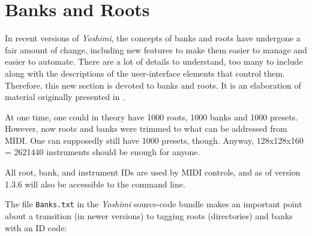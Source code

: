 %
%
%

\section{Banks and Roots}
\label{sec:banks_and_roots}

   In recent versions of \textsl{Yoshimi}, the concepts of banks and roots
   have undergone a fair amount of change, including new features to make
   them easier to manage and easier to automate.  There are a lot of details
   to understand, too many to include along with the descriptions of the
   user-interface elements that control them.
   Therefore, this new section is devoted to banks and roots.
   It is an elaboration of material originally presented in
   .

   At one time, one could in theory have 1000 roots, 1000 banks and 1000
   presets.  However, now roots and banks were trimmed to what can be
   addressed from MIDI. One can supposedly still have 1000 presets, though.
   Anyway, 128x128x160 = 2621440 instruments should be enough for anyone.

   All root, bank, and instrument IDs are used by MIDI controls, and as of 
   version 1.3.6 will also be accessible to the command line.

   The file \texttt{Banks.txt} in the \textsl{Yoshimi} source-code bundle
   makes an important point about a transition (in newer versions)
   to tagging roots (directories) and banks with an ID code:

